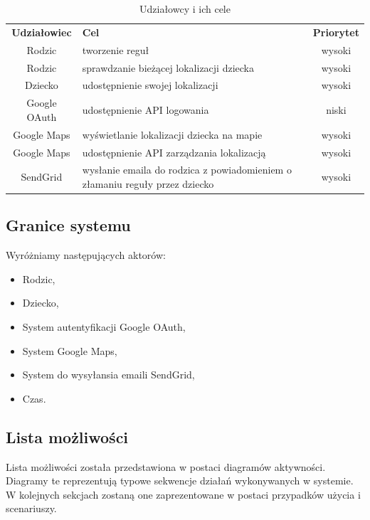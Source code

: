 \documentclass{sprawozdanie-agh}
\begin{document}
			\begin{table}[h]
				\begin{center}
					\begin{tabular}{|c|p{7cm}|c|}
						\cline{1-3}
						\textbf{Udziałowiec} & \textbf{Cel} & \textbf{Priorytet} \\
						\cline{1-3}
						Rodzic & tworzenie reguł & wysoki \\
						\cline{1-3}
						Rodzic & sprawdzanie bieżącej lokalizacji dziecka & wysoki \\
						\cline{1-3}
						Dziecko & udostępnienie swojej lokalizacji & wysoki \\
						\cline{1-3}
						Google OAuth & udostępnienie API logowania & niski \\
						\cline{1-3}
						Google Maps & wyświetlanie lokalizacji dziecka na mapie & wysoki \\
						\cline{1-3}
						Google Maps & udostępnienie API zarządzania lokalizacją & wysoki \\
						\cline{1-3}
						SendGrid & wysłanie emaila do rodzica z powiadomieniem o złamaniu reguły przez dziecko  & wysoki \\
						\cline{1-3}
					\end{tabular}
				\end{center}
				\caption{Udziałowcy i ich cele}
			\end{table}

		\subsection{Granice systemu}

			Wyróżniamy następujących aktorów:
			\begin{itemize}
				\item Rodzic,
				\item Dziecko,
				\item System autentyfikacji Google OAuth,
				\item System Google Maps,
				\item System do wysyłansia emaili SendGrid,
				\item Czas.
			\end{itemize}

		\subsection{Lista możliwości}

			Lista możliwości została przedstawiona w postaci diagramów aktywności. Diagramy te reprezentują typowe sekwencje działań wykonywanych w systemie. W kolejnych sekcjach zostaną one zaprezentowane w postaci przypadków użycia i scenariuszy.
\end{document}

